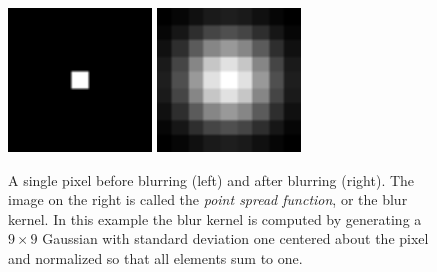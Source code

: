\documentclass[10pt,a4paper]{article}
\begin{document}
	\begin{figure}[H]
		\centering
		\includegraphics[width=1.5in]{../figures/pixel} \hspace{2em}
		\includegraphics[width=1.5in]{../figures/psf}
		\caption{A single pixel before blurring (left) and after blurring (right). The image on the right is called the \emph{point spread function}, or the blur kernel. In this 	
		example the blur kernel is computed by generating a $9 \times 9$ Gaussian with standard deviation one centered about the pixel and normalized so that all
		elements sum to one.  }
	\end{figure}
	
\end{document}
